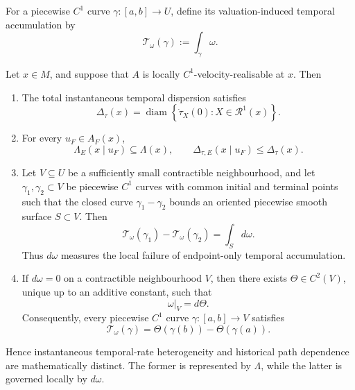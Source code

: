 \documentclass[graybox,natbib]{SNmult}
\providecommand{\1}{}
\renewcommand{\1}{\mathbbm 1}
\begin{document}
For a piecewise \(C^1\) curve \(\gamma:[a,b]\rightarrow U\), define its
valuation-induced temporal accumulation by
\begin{equation}
\mathcal T_\omega(\gamma)
:=
\int_\gamma\omega.
\label{eq:temporal-line-integral}
\end{equation}

\begin{theorem}
\label{thm:local-structure}

Let \(x\in M\), and suppose that \(A\) is locally
\(C^1\)-velocity-realisable at \(x\). Then

\begin{enumerate}

\item[(i)] The total instantaneous temporal dispersion satisfies
\[
\Delta_\tau(x)
=
\operatorname{diam}
\left\{
\dot\tau_X(0):
X\in\mathcal R^1(x)
\right\}.
\]

\item[(ii)] For every \(u_F\in A_F(x)\),
\[
\Lambda_E(x\mid u_F)\subseteq\Lambda(x),
\qquad
\Delta_{\tau,E}(x\mid u_F)\leq\Delta_\tau(x).
\]

\item[(iii)] Let \(V\subseteq U\) be a sufficiently small contractible
neighbourhood, and let \(\gamma_1,\gamma_2\subset V\) be piecewise \(C^1\)
curves with common initial and terminal points such that the closed curve
\(\gamma_1-\gamma_2\) bounds an oriented piecewise smooth surface
\(S\subset V\). Then
\begin{equation}
\mathcal T_\omega(\gamma_1)
-
\mathcal T_\omega(\gamma_2)
=
\int_S d\omega.
\label{eq:local-structure-curvature}
\end{equation}
Thus \(d\omega\) measures the local failure of endpoint-only temporal
accumulation.

\item[(iv)] If \(d\omega=0\) on a contractible neighbourhood \(V\), then
there exists \(\Theta\in C^2(V)\), unique up to an additive constant, such
that
\[
\omega|_V=d\Theta.
\]
Consequently, every piecewise \(C^1\) curve
\(\gamma:[a,b]\rightarrow V\) satisfies
\begin{equation}
\mathcal T_\omega(\gamma)
=
\Theta(\gamma(b))-\Theta(\gamma(a)).
\label{eq:local-state-time}
\end{equation}

\end{enumerate}

Hence instantaneous temporal-rate heterogeneity and historical path dependence
are mathematically distinct. The former is represented by \(\Lambda\), while
the latter is governed locally by \(d\omega\).
\end{theorem}
\end{document}
